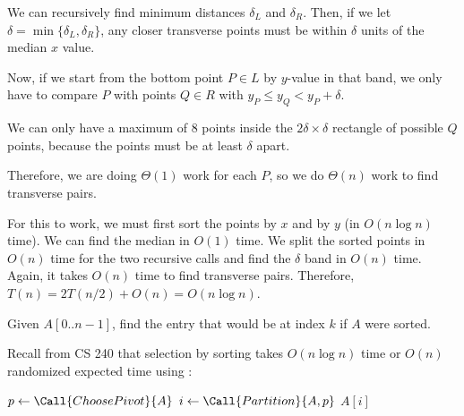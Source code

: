 We can recursively find minimum distances $\delta_L$ and $\delta_R$.
Then, if we let $\delta = \min\{\delta_L,\delta_R\}$,
any closer transverse points must be within $\delta$ units of the median $x$ value.

Now, if we start from the bottom point $P \in L$ by $y$-value in that band,
we only have to compare $P$ with points $Q \in R$ with $y_P \leq y_Q < y_P + \delta$.

We can only have a maximum of 8 points inside the $2\delta \times \delta$
rectangle of possible $Q$ points, because the points must be at least $\delta$ apart.

Therefore, we are doing $\Theta(1)$ work for each $P$, so we do $\Theta(n)$
work to find transverse pairs.

For this to work, we must first sort the points by $x$ and by $y$ (in $O(n\log n)$ time).
We can find the median in $O(1)$ time.
We split the sorted points in $O(n)$ time for the two recursive calls
and find the $\delta$ band in $O(n)$ time.
Again, it takes $O(n)$ time to find transverse pairs.
Therefore, $T(n) = 2T(n/2) + O(n) = O(n\log n)$.

\begin{problem}[selection]
  Given $A[0..n-1]$, find the entry that would be at index $k$ if $A$ were sorted.
\end{problem}

Recall from CS 240 that selection by sorting takes $O(n\log n)$ time
or $O(n)$ randomized expected time using :

\begin{algorithm}[H]
  \caption{}
  \begin{algorithmic}[1]
    \State $p \gets \Call{ChoosePivot}{A}$
    \State $i \gets \Call{Partition}{A, p}$ 
     \Return $A[i]$
     \Return {}
    \Else{} \Return {}
    \EndIf
  \end{algorithmic}
\end{algorithm}

